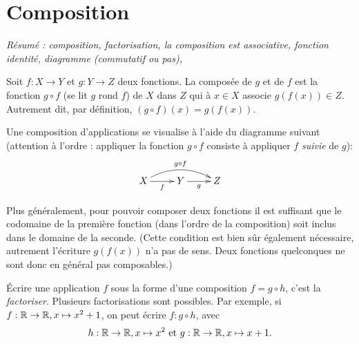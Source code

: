 \section{Composition}

\emph{Résumé : composition, factorisation, la composition est associative, fonction identité, diagramme (commutatif ou pas), }




\begin{definition}[Composition]
Soit $f : X\to Y$ et $g : Y\to Z$ deux fonctions. La composée de $g$ et de $f$ est la fonction $g\circ f$ (se lit \og $g$ rond $f$\fg) de $X$ dans $Z$ qui à $x\in X$ associe $g(f(x)) \in Z$. Autrement dit, par définition, $(g\circ f)(x) = g(f(x))$.

Une composition d'applications se visualise à l'aide du diagramme suivant (attention à l'ordre : appliquer la fonction $g\circ f$ consiste à appliquer $f$ \emph{suivie} de $g$):
\[
\xymatrix{
X \ar[r]_{f} \ar@/^1pc/[rr]^{g\circ f}& Y \ar[r]_{g}& Z
}
\]
\end{definition}

Plus généralement, pour pouvoir composer deux fonctions il est suffisant que le codomaine de la première fonction (dans l'ordre de la composition) soit inclus dans le domaine de la seconde. (Cette condition est bien sûr également nécessaire, autrement l'écriture $g(f(x))$ n'a pas de sens. Deux fonctions quelconques ne sont donc en général pas composables.)

\begin{definition}
\'Ecrire une application $f$ sous la forme d'une composition $f = g\circ h$, c'est la \emph{factoriser}. Plusieurs factorisations sont possibles. Par exemple, si $f : \mathbb{R}\to \mathbb{R}, x\mapsto x^2+1$, on peut écrire $f : g\circ h$, avec
\[
h : \mathbb{R}\to \mathbb{R}, x\mapsto x^2 
\text{ et }
g : \mathbb{R}\to \mathbb{R}, x\mapsto x+1.
\]
\end{definition}

\noindent{}


